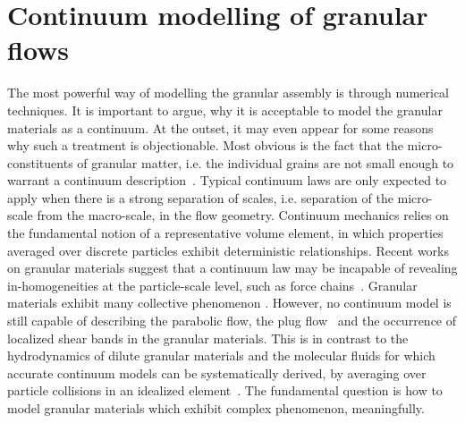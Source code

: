 \section{Continuum modelling of granular flows}
The most powerful way of modelling the granular assembly is through numerical 
techniques. It is important to argue, why it is acceptable to model the 
granular materials as a continuum. At the outset, it may even appear for some 
reasons why such a treatment is objectionable. Most obvious is the fact that 
the micro-constituents of granular matter, i.e. the individual grains are not 
small enough to warrant a continuum description~\citep{Kamrin2007}. Typical 
continuum laws are only expected to apply when there is a strong separation of 
scales, i.e. separation of the micro-scale from the macro-scale, in the flow 
geometry. Continuum mechanics relies on the fundamental notion of a 
representative volume element, in which properties averaged over discrete 
particles exhibit deterministic relationships. Recent works on granular 
materials suggest that a continuum law may be incapable of revealing 
in-homogeneities at the particle-scale level, such as force 
chains~\citep{Rycroft2009}. Granular materials exhibit many collective 
phenomenon \citep{Jaeger1996}. However, no continuum model is still capable of 
describing the parabolic flow, the plug flow~\citep{Rycroft2006} and the 
occurrence of localized shear bands in the granular materials. This is in 
contrast to the hydrodynamics of dilute granular materials and the molecular 
fluids for which accurate continuum models can be systematically derived, by 
averaging over particle collisions in an idealized element~\citep{Jenkins1983}. 
The fundamental question is how to model granular materials which exhibit 
complex phenomenon, meaningfully. 

